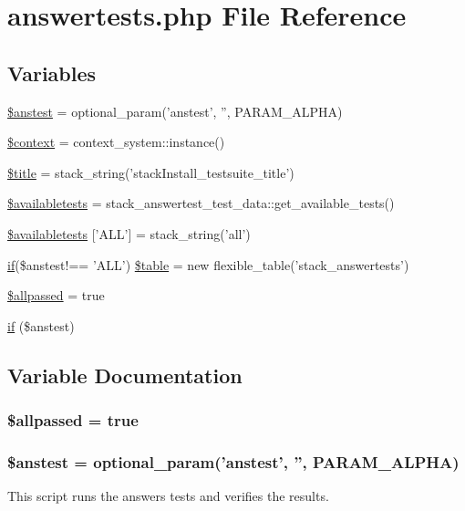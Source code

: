 \hypertarget{answertests_8php}{
\section{answertests.php File Reference}
\label{answertests_8php}
}
\subsection*{Variables}
\begin{DoxyCompactItemize}
\item 
\hyperlink{answertests_8php_a82b5f102f126b432ed3c107854278cf9}{\$anstest} = optional\_\-param('anstest', '', PARAM\_\-ALPHA)
\item 
\hyperlink{answertests_8php_ae05dedb802ada0155efdece2044fed64}{\$context} = context\_\-system::instance()
\item 
\hyperlink{answertests_8php_ada57e7bb7c152edad18fe2f166188691}{\$title} = stack\_\-string('stackInstall\_\-testsuite\_\-title')
\item 
\hyperlink{answertests_8php_aa40691406a81b9e8192fc2db224c48d2}{\$availabletests} = stack\_\-answertest\_\-test\_\-data::get\_\-available\_\-tests()
\item 
\hyperlink{answertests_8php_a3361b3cc65395e010e9d35b1bbfde7d2}{\$availabletests} \mbox{[}'ALL'\mbox{]} = stack\_\-string('all')
\item 
\hyperlink{caschat_8php_a2018ad56dfaea89ba7f32f4f912be98f}{if}(\$anstest!== 'ALL') \hyperlink{answertests_8php_a7c64d22213f45a8e0013b6ff46009c84}{\$table} = new flexible\_\-table('stack\_\-answertests')
\item 
\hyperlink{answertests_8php_ab5a10be91c162cb48ac439a779b80046}{\$allpassed} = true
\item 
\hyperlink{answertests_8php_a8685f62ef2250e3df3ffb6a8c32e5ffa}{if} (\$anstest)
\end{DoxyCompactItemize}


\subsection{Variable Documentation}
\hypertarget{answertests_8php_ab5a10be91c162cb48ac439a779b80046}{
\subsubsection[{\$allpassed}]{\setlength{\rightskip}{0pt plus 5cm}\$allpassed = true}}
\label{answertests_8php_ab5a10be91c162cb48ac439a779b80046}
\hypertarget{answertests_8php_a82b5f102f126b432ed3c107854278cf9}{
\subsubsection[{\$anstest}]{\setlength{\rightskip}{0pt plus 5cm}\$anstest = optional\_\-param('anstest', '', PARAM\_\-ALPHA)}}
\label{answertests_8php_a82b5f102f126b432ed3c107854278cf9}
This script runs the answers tests and verifies the results.


